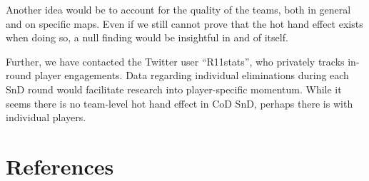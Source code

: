 \documentclass{article}
\begin{document}
Another idea would be to account for the quality of the teams, both in
general and on specific maps. Even if we still cannot prove that the hot
hand effect exists when doing so, a null finding would be insightful in
and of itself.

Further, we have contacted the Twitter user ``R11stats'', who privately
tracks in-round player engagements. Data regarding individual
eliminations during each SnD round would facilitate research into
player-specific momentum. While it seems there is no team-level hot hand
effect in CoD SnD, perhaps there is with individual players.

\hypertarget{references}{%
\section*{References}\label{references}}
\end{document}
